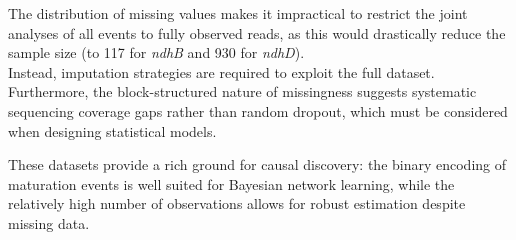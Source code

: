\documentclass[
]{article}
\theoremstyle{definition}
\theoremstyle{remark}
\begin{document}
The distribution of missing values makes it impractical to restrict the
joint analyses of all events to fully observed reads, as this would
drastically reduce the sample size (to 117 for \emph{ndhB} and 930 for
\emph{ndhD}).\\
Instead, imputation strategies are required to exploit the full dataset.
Furthermore, the block-structured nature of missingness suggests
systematic sequencing coverage gaps rather than random dropout, which
must be considered when designing statistical models.

These datasets provide a rich ground for causal discovery: the binary
encoding of maturation events is well suited for Bayesian network
learning, while the relatively high number of observations allows for
robust estimation despite missing data.

\begin{table}

\caption{\label{tbl-glimpse_data}Untreated working datasets}

\begin{minipage}{\linewidth}



\end{minipage}%
\newline
\begin{minipage}{\linewidth}


\end{minipage}
\end{table}
\end{document}
